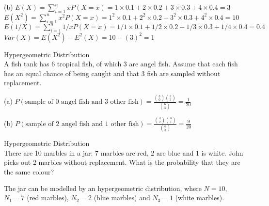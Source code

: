 \documentclass[bigtut]{tutorial}\usepackage[]{graphicx}\usepackage[]{color}
\begin{document}
\begin{tutorial}
\begin{questions}
\begin{solution}
(b) 
$E(X) =\sum_{i=1}^{n} x P(X=x) = 1 \times 0.1 + 2 \times 0.2 + 3 \times 0.3 + 4 \times 0.4 = 3$ \\
$E(X^2) =\sum_{i=1}^{n} x^2 P(X=x) = 1^2 \times 0.1 + 2^2 \times 0.2 + 3^2 \times 0.3 + 4^2 \times 0.4 = 10$ \\
$E(1/X) =\sum_{i=1}^{n} 1/x P(X=x) = 1/1 \times 0.1 + 1/2 \times 0.2 + 1/3 \times 0.3 + 1/4 \times 0.4 = 0.4$ \\
$Var(X) = E(X^2) - E^2(X) = 10 -(3)^2 = 1$ \\
\end{solution}

\question Hypergeometric Distribution \\

A fish tank has 6 tropical fish, of which 3 are angel fish. Assume that each fish has an equal chance of being caught and that 3 fish are sampled without replacement. \\


\begin{solution}
(a) 
$P(\text{sample of 0 angel fish and 3 other fish})
= \frac{ {3 \choose 0}{3 \choose 3} }{ {6 \choose 3}  } =  \frac{1}{20}$

(b) 
$P(\text{sample of 2 angel fish and 1 other fish})
= \frac{ {3 \choose 2}{3 \choose 1} }{ {6 \choose 3}  } =  \frac{9}{20}$
\end{solution}


\question Hypergeometric Distribution \\

There are 10 marbles in a jar: 7 marbles are red, 2 are blue and 1 is white. 
John picks out 2 marbles without replacement. What is the probability that they are the same colour?

\begin{solution}
The jar can be modelled by an hypergeometric distribution, where $N=10$, $N_{1}=7$ (red marbles), $N_{2}=2$ (blue marbles) and $N_{3}=1$ (white marbles).


\end{solution}
\end{questions}
\end{tutorial}
\end{document}
